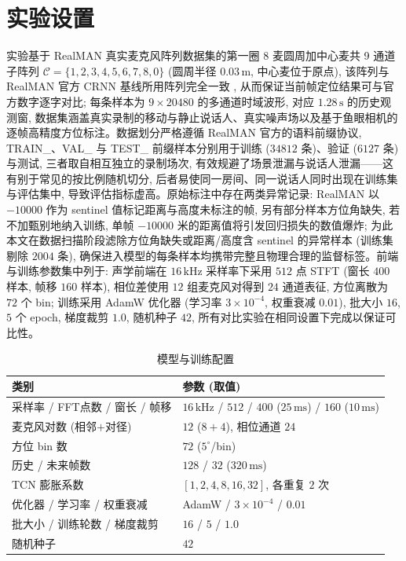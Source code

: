 \documentclass[lang=cn,a4paper,newtx]{elegantpaper}
\begin{document}
\section{实验设置}

实验基于 RealMAN \cite{yang2024realman} 真实麦克风阵列数据集的第一圈 8 麦圆周加中心麦共 9 通道子阵列 $\mathcal{C}=\{1,2,3,4,5,6,7,8,0\}$ (圆周半径 $0.03\,\mathrm{m}$, 中心麦位于原点), 该阵列与 RealMAN 官方 CRNN 基线所用阵列完全一致 \cite{wang2024ipdnet}, 从而保证当前帧定位结果可与官方数字逐字对比; 每条样本为 $9\times20480$ 的多通道时域波形, 对应 $1.28\,\mathrm{s}$ 的历史观测窗, 数据集涵盖真实录制的移动与静止说话人、真实噪声场以及基于鱼眼相机的逐帧高精度方位标注。数据划分严格遵循 RealMAN 官方的语料前缀协议, TRAIN\_、VAL\_ 与 TEST\_ 前缀样本分别用于训练 ($34812$ 条)、验证 ($6127$ 条) 与测试, 三者取自相互独立的录制场次, 有效规避了场景泄漏与说话人泄漏——这有别于常见的按比例随机切分, 后者易使同一房间、同一说话人同时出现在训练集与评估集中, 导致评估指标虚高。原始标注中存在两类异常记录: RealMAN 以 $-10000$ 作为 sentinel 值标记距离与高度未标注的帧, 另有部分样本方位角缺失, 若不加甄别地纳入训练, 单帧 $-10000$ 米的距离值将引发回归损失的数值爆炸; 为此本文在数据扫描阶段滤除方位角缺失或距离/高度含 sentinel 的异常样本 (训练集剔除 $2004$ 条), 确保进入模型的每条样本均携带完整且物理合理的监督标签。前端与训练参数集中列于: 声学前端在 $16\,\mathrm{kHz}$ 采样率下采用 $512$ 点 STFT (窗长 $400$ 样本, 帧移 $160$ 样本), 相位差使用 $12$ 组麦克风对得到 $24$ 通道表征, 方位离散为 $72$ 个 bin; 训练采用 AdamW 优化器 (学习率 $3{\times}10^{-4}$, 权重衰减 $0.01$), 批大小 $16$, $5$ 个 epoch, 梯度裁剪 $1.0$, 随机种子 $42$, 所有对比实验在相同设置下完成以保证可比性。

\begin{table}[!htb]
  \centering
  \caption{模型与训练配置}
  \label{tab:config}
  \begin{tabular}{ll}
    \toprule
    类别 & 参数 (取值) \\
    \midrule
    采样率 / FFT点数 / 窗长 / 帧移 & $16\,\mathrm{kHz}$ / $512$ / $400$ ($25\,\mathrm{ms}$) / $160$ ($10\,\mathrm{ms}$) \\
    麦克风对数 (相邻$+$对径) & $12$ ($8+4$), 相位通道 $24$ \\
    方位 bin 数 & $72$ ($5^\circ$/bin) \\
    历史 / 未来帧数 & $128$ / $32$ ($320\,\mathrm{ms}$) \\
    TCN 膨胀系数 & $[1,2,4,8,16,32]$, 各重复 $2$ 次 \\
    优化器 / 学习率 / 权重衰减 & AdamW / $3{\times}10^{-4}$ / $0.01$ \\
    批大小 / 训练轮数 / 梯度裁剪 & $16$ / $5$ / $1.0$ \\
    随机种子 & $42$ \\
    \bottomrule
  \end{tabular}
\end{table}
\end{document}
